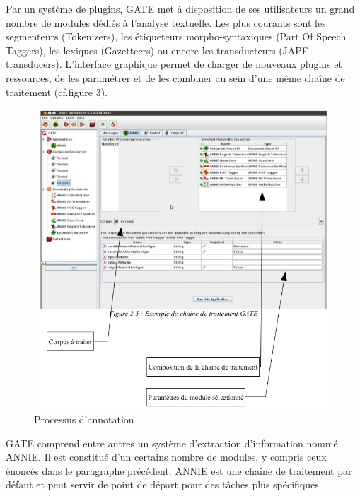 \documentclass[a4paper, 11pt]{report}
\begin{document}
Par un système de plugins, GATE met à disposition de ses utilisateurs un grand nombre de
modules dédiés à l'analyse textuelle. Les plus courants sont les segmenteurs (Tokenizers), les
étiqueteurs morpho-syntaxiques (Part Of Speech Taggers), les lexiques (Gazetteers) ou encore les
transducteurs (JAPE transducers). L'interface graphique permet de charger de nouveaux plugins et
ressources, de les paramétrer et de les combiner au sein d'une même chaîne de traitement (cf.figure 3).\cite{SL10}
\begin{figure}[H]
\begin{center}
\includegraphics[scale=0.3]{img/exempleChaineTraitement.png}
\end{center}
\caption{Processus d'annotation}
\end{figure}
GATE comprend entre autres un système d'extraction d'information nommé ANNIE. Il est constitué d'un certains nombre de modules, y compris ceux énoncés dans le paragraphe précédent. ANNIE est une chaîne de traitement par défaut et peut servir de point de départ pour des tâches plus spécifiques.
\end{document}
